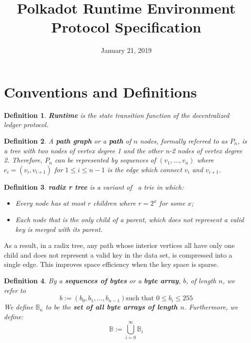 \documentclass{article}
\newcommand{\assign}{:=}
\newcommand{\tmstrong}[1]{\textbf{#1}}
\newcommand{\tmtextbf}[1]{{\bfseries{#1}}}
\newcommand{\tmtexttt}[1]{{\ttfamily{#1}}}
\newcommand{\tmverbatim}[1]{{\ttfamily{#1}}}
\newtheorem{definition}{Definition}
\providecommand{\tmstrong}[1]{\tmtextbf{#1}}
\providecommand{\tmtextbf}[1]{\tmtextbf{#1}}
\providecommand{\tmverbatim}[1]{\tmtexttt{#1}}
\newtheorem{definition}{Definition}
\begin{document}
\title{
  Polkadot Runtime Environment\\
  {\Large Protocol Specification}
}

\date{January 21, 2019}

\maketitle

\section{Conventions and Definitions}

\begin{definition}
  {\tmstrong{Runtime}} is the state transition function of the decentralized
  ledger protocol.\tmverbatim{}
\end{definition}

\begin{definition}
  \label{def-path-graph}A {\tmstrong{path graph}} or a {\tmstrong{path}} of
  $n$ nodes, formally referred to as {\tmstrong{$P_n$}}, is a tree with two
  nodes of vertex degree 1 and the other n-2 nodes of vertex degree 2.
  Therefore, $P_n$ can be represented by sequences of $(v_1, \ldots, v_n)$
  where $e_i = (v_i, v_{i + 1})$ for $1 \leqslant i \leqslant n - 1$ is the
  edge which connect $v_i$ and $v_{i + 1}$.
\end{definition}

\begin{definition}
  \label{def-radix-tree}{\tmstrong{radix r tree}} is a variant of \ a trie in
  which:
  \begin{itemize}
    \item Every node has at most $r$ children where $r = 2^x$ for some $x$;
    
    \item Each node that is the only child of a parent, which does not
    represent a valid key is merged with its parent.
  \end{itemize}
\end{definition}

As a result, in a radix tree, any path whose interior vertices all have only
one child and does not represent a valid key in the data set, is compressed
into a single edge. This improves space efficiency when the key space is
sparse.

\begin{definition}
  By a {\tmstrong{sequences of bytes}} or a {\tmstrong{byte array}}, $b$, of
  length $n$, we refer to
  \[ b \assign (b_0, b_1, ..., b_{n - 1})  \text{such that } 0 \leqslant b_i
     \leqslant 255 \]
  We define $\mathbb{B}_n$ to be the {\tmstrong{set of all byte arrays of
  length $n$}}. Furthermore, we define:
  \[ \mathbb{B} \assign \bigcup^{\infty}_{i = 0} \mathbb{B}_i \]
\end{definition}
\end{document}
